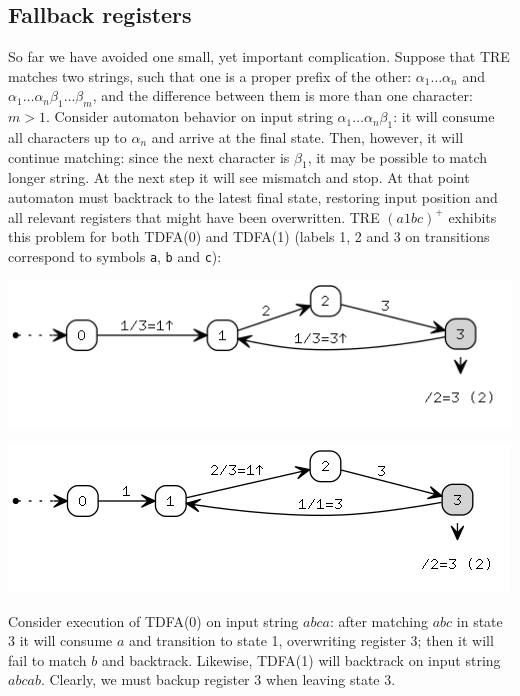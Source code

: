 \documentclass{article}
\newenvironment{Xfig}
    {\par\medskip\noindent\minipage{\linewidth}\begin{center}}
    {\end{center}\endminipage\par\medskip}
\theoremstyle{definition}
\begin{document}
\begin{multicols}{2}
\subsection*{Fallback registers}

So far we have avoided one small, yet important complication.
Suppose that TRE matches two strings, such that one is a proper prefix of the other:
$\alpha_1 \dots \alpha_n$ and $\alpha_1 \dots \alpha_n \beta_1 \dots \beta_m$,
and the difference between them is more than one character: $m \!>\! 1$.
Consider automaton behavior on input string $\alpha_1 \dots \alpha_n \beta_1$:
it will consume all characters up to $\alpha_n$ and arrive at the final state.
Then, however, it will continue matching: since the next character is $\beta_1$, it may be possible to match longer string.
At the next step it will see mismatch and stop.
At that point automaton must backtrack to the latest final state,
restoring input position and all relevant registers that might have been overwritten.
TRE $(a 1 bc)^+$ exhibits this problem for both TDFA(0) and TDFA(1)
(labels 1, 2 and 3 on transitions correspond to symbols \texttt{a}, \texttt{b} and \texttt{c}):

\begin{Xfig}
\includegraphics[width=\linewidth]{img/fallback_tdfa0.png}
\end{Xfig}

\begin{Xfig}
\includegraphics[width=\linewidth]{img/fallback_tdfa1.png}
\end{Xfig}

Consider execution of TDFA(0) on input string $abca$: after matching $abc$ in state 3 it will consume $a$ and transition to state 1,
overwriting register 3; then it will fail to match $b$ and backtrack.
Likewise, TDFA(1) will backtrack on input string $abcab$.
Clearly, we must backup register 3 when leaving state 3.
\\


\end{multicols}
\end{document}
